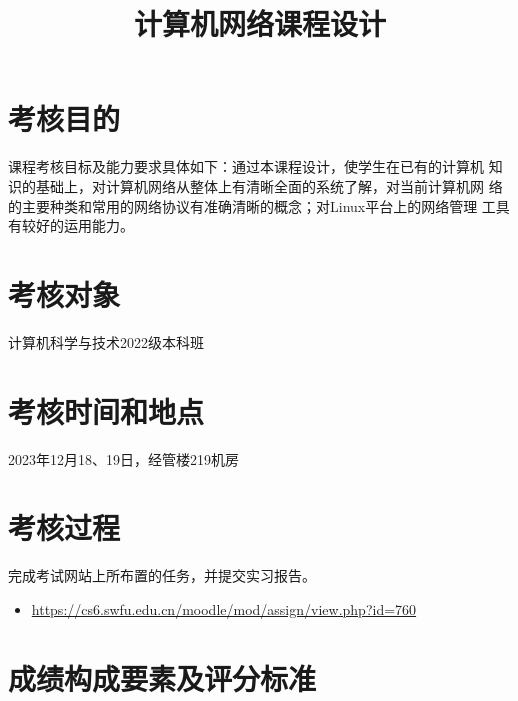 \documentclass{swfuassessment}
\title{计算机网络课程设计}
\begin{document}
\headone{}

\section{考核目的}

课程考核目标及能力要求具体如下：通过本课程设计，使学生在已有的计算机
知识的基础上，对计算机网络从整体上有清晰全面的系统了解，对当前计算机网
络的主要种类和常用的网络协议有准确清晰的概念；对Linux平台上的网络管理
工具有较好的运用能力。

\section{考核对象}

计算机科学与技术2022级本科班

\section{考核时间和地点}

2023年12月18、19日，经管楼219机房

\section{考核过程}

完成考试网站上所布置的任务，并提交实习报告。

\begin{itemize}
\item \url{https://cs6.swfu.edu.cn/moodle/mod/assign/view.php?id=760}
\end{itemize}

\section{成绩构成要素及评分标准}
\end{document}
